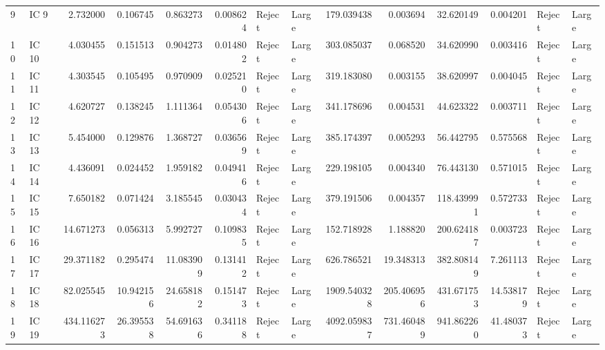 \begin{tabular}{llrrrrllrrrrll}
9  &   IC 9 &           2.732000 &   0.106745 &            0.863273 &  0.008624 &   Reject &       Large &               179.039438 &    0.003694 &                 32.620149 &   0.004201 &  Reject &       Large \\
10 &  IC 10 &           4.030455 &   0.151513 &            0.904273 &  0.014802 &   Reject &       Large &               303.085037 &    0.068520 &                 34.620990 &   0.003416 &  Reject &       Large \\
11 &  IC 11 &           4.303545 &   0.105495 &            0.970909 &  0.025210 &   Reject &       Large &               319.183080 &    0.003155 &                 38.620997 &   0.004045 &  Reject &       Large \\
12 &  IC 12 &           4.620727 &   0.138245 &            1.111364 &  0.054306 &   Reject &       Large &               341.178696 &    0.004531 &                 44.623322 &   0.003711 &  Reject &       Large \\
13 &  IC 13 &           5.454000 &   0.129876 &            1.368727 &  0.036569 &   Reject &       Large &               385.174397 &    0.005293 &                 56.442795 &   0.575568 &  Reject &       Large \\
14 &  IC 14 &           4.436091 &   0.024452 &            1.959182 &  0.049416 &   Reject &       Large &               229.198105 &    0.004340 &                 76.443130 &   0.571015 &  Reject &       Large \\
15 &  IC 15 &           7.650182 &   0.071424 &            3.185545 &  0.030434 &   Reject &       Large &               379.191506 &    0.004357 &                118.439991 &   0.572733 &  Reject &       Large \\
16 &  IC 16 &          14.671273 &   0.056313 &            5.992727 &  0.109835 &   Reject &       Large &               152.718928 &    1.188820 &                200.624187 &   0.003723 &  Reject &       Large \\
17 &  IC 17 &          29.371182 &   0.295474 &           11.083909 &  0.131412 &   Reject &       Large &               626.786521 &   19.348313 &                382.808149 &   7.261113 &  Reject &       Large \\
18 &  IC 18 &          82.025545 &  10.942156 &           24.658182 &  0.151473 &   Reject &       Large &              1909.540328 &  205.406956 &                431.671753 &  14.538179 &  Reject &       Large \\
19 &  IC 19 &         434.116273 &  26.395538 &           54.691636 &  0.341188 &   Reject &       Large &              4092.059837 &  731.460489 &                941.862260 &  41.480373 &  Reject &       Large \\
\bottomrule
\end{tabular}
